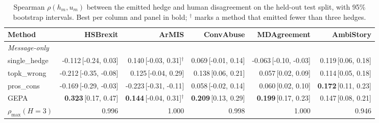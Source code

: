 \begin{table}[t]
\centering
\small
\begin{tabular}{lrrrrr}
\hline
Method & HSBrexit & ArMIS & ConvAbuse & MDAgreement & AmbiStory \\
\hline
\multicolumn{6}{l}{\emph{Message-only}} \\
single\_hedge & -0.112{\scriptsize\,[-0.24, 0.03]} & 0.140{\scriptsize\,[-0.03, 0.31]}$^\dagger$ & 0.069{\scriptsize\,[-0.01, 0.14]} & -0.063{\scriptsize\,[-0.10, -0.03]} & 0.119{\scriptsize\,[0.06, 0.18]} \\
topk\_wrong & -0.212{\scriptsize\,[-0.35, -0.08]} & 0.125{\scriptsize\,[-0.04, 0.29]} & 0.138{\scriptsize\,[0.06, 0.21]} & 0.057{\scriptsize\,[0.02, 0.09]} & 0.114{\scriptsize\,[0.05, 0.18]} \\
pros\_cons & -0.169{\scriptsize\,[-0.29, -0.03]} & -0.223{\scriptsize\,[-0.31, -0.11]} & 0.058{\scriptsize\,[-0.02, 0.14]} & 0.060{\scriptsize\,[0.02, 0.10]} & \textbf{0.172}{\scriptsize\,[0.11, 0.23]} \\
GEPA & \textbf{0.323}{\scriptsize\,[0.17, 0.47]} & \textbf{0.144}{\scriptsize\,[-0.04, 0.31]}$^\dagger$ & \textbf{0.209}{\scriptsize\,[0.13, 0.29]} & \textbf{0.199}{\scriptsize\,[0.17, 0.23]} & 0.147{\scriptsize\,[0.08, 0.21]} \\
$\rho_{\max}(H{=}3)$ & 0.996 & 1.000 & 0.998 & 1.000 & 0.946 \\
\hline
\end{tabular}
\caption{Spearman $\rho(h_m,u_m)$ between the emitted hedge and human disagreement on the held-out test split, with 95\% bootstrap intervals. Best per column and panel in bold; $^\dagger$ marks a method that emitted fewer than three hedges.}
\label{tab:main}
\end{table}